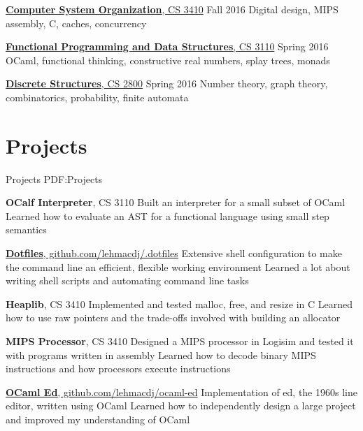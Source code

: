 \documentclass[letterpaper,10pt,oneside]{simpleresume}
\begin{document}
\begin{minipage}[t][0pt]{\linewidth}
\begin{body}
\href{https://www.cs.cornell.edu/courses/cs3410/2016fa/}
{\textbf{Computer System Organization}, CS 3410}
\hfill Fall 2016
\BulletItem%
Digital design, MIPS assembly, C, caches, concurrency

\href{https://www.cs.cornell.edu/courses/cs3110/2016sp/}
{\textbf{Functional Programming and Data Structures}, CS 3110}
\hfill Spring 2016
\BulletItem%
OCaml, functional thinking, constructive real numbers, splay trees, monads

\href{https://www.cs.cornell.edu/courses/cs2800/2016sp/}
{\textbf{Discrete Structures}, CS 2800}
\hfill Spring 2016
\BulletItem%
Number theory, graph theory, combinatorics, probability, finite automata

\section%
{Projects}
{Projects}
{PDF:Projects}

\textbf{OCalf Interpreter}, CS 3110
\BulletItem%
Built an interpreter for a small subset of OCaml
\BulletItem%
Learned how to evaluate an AST for a functional language using small step
semantics

\href{https://www.github.com/lehmacdj/.dotfiles}
{\textbf{Dotfiles}, github.com/lehmacdj/.dotfiles}
\BulletItem%
Extensive shell configuration to make the command line an efficient, flexible
working environment
\BulletItem%
Learned a lot about writing shell scripts and automating command line tasks

\textbf{Heaplib}, CS 3410
\BulletItem%
Implemented and tested malloc, free, and resize in C
\BulletItem%
Learned how to use raw pointers and the trade-offs involved with building
an allocator

\textbf{MIPS Processor}, CS 3410
\BulletItem%
Designed a MIPS processor in Logisim and tested it with programs written in
assembly
\BulletItem%
Learned how to decode binary MIPS instructions and how processors execute
instructions

\href{https://www.github.com/lehmacdj/ocaml-ed}
{\textbf{OCaml Ed}, github.com/lehmacdj/ocaml-ed}
\BulletItem%
Implementation of ed, the 1960s line editor, written using OCaml
\BulletItem%
Learned how to independently design a large project and improved my
understanding of OCaml



\end{body}
\end{minipage}
\end{document}
